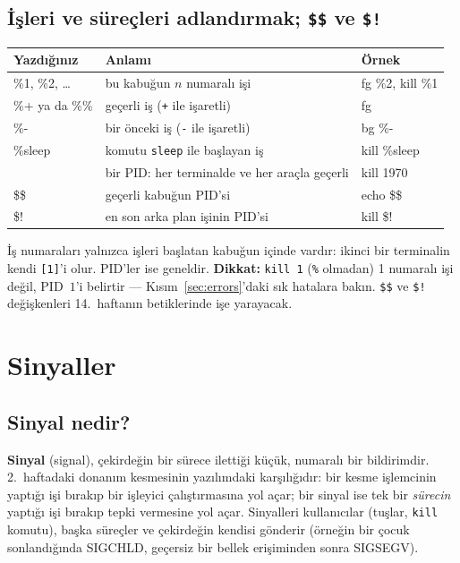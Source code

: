 \documentclass[11pt,a4paper]{article}
\newcommand{\term}[1]{\textbf{\color{mintdeep}#1}}
\newcommand{\cmd}[1]{\texttt{#1}}
\begin{document}
\subsection{İşleri ve süreçleri adlandırmak; \texttt{\$\$} ve \texttt{\$!}}

\begin{center}
\renewcommand{\arraystretch}{1.2}
\begin{tabularx}{\linewidth}{>{\ttfamily}l >{\raggedright\arraybackslash}X >{\ttfamily}l}
\toprule
\textbf{\rmfamily Yazdığınız} & \textbf{Anlamı} & \textbf{\rmfamily Örnek}\\
\midrule
\%1, \%2, \dots & bu kabuğun $n$ numaralı işi & fg \%2, kill \%1\\
\%+ \textrm{ya da} \%\% & geçerli iş (\texttt{+} ile işaretli) & fg\\
\%- & bir önceki iş (\texttt{-} ile işaretli) & bg \%-\\
\%sleep & komutu \texttt{sleep} ile başlayan iş & kill \%sleep\\
1970 & bir PID: her terminalde ve her araçla geçerli & kill 1970\\
\$\$ & geçerli kabuğun PID'si & echo \$\$\\
\$! & en son arka plan işinin PID'si & kill \$!\\
\bottomrule
\end{tabularx}
\end{center}

İş numaraları yalnızca işleri başlatan kabuğun içinde vardır: ikinci bir terminalin kendi \texttt{[1]}'i olur. PID'ler ise geneldir. \textbf{Dikkat:} \cmd{kill 1} (\texttt{\%} olmadan) 1 numaralı işi değil, PID~$1$'i belirtir --- Kısım~\ref{sec:errors}'daki sık hatalara bakın. \verb|$$| ve \verb|$!| değişkenleri 14.~haftanın betiklerinde işe yarayacak.

\section{Sinyaller}
\label{sec:signals}

\subsection{Sinyal nedir?}

\term{Sinyal} (signal), çekirdeğin bir sürece ilettiği küçük, numaralı bir bildirimdir. 2.~haftadaki donanım kesmesinin yazılımdaki karşılığıdır: bir kesme işlemcinin yaptığı işi bırakıp bir işleyici çalıştırmasına yol açar; bir sinyal ise tek bir \emph{sürecin} yaptığı işi bırakıp tepki vermesine yol açar. Sinyalleri kullanıcılar (tuşlar, \cmd{kill} komutu), başka süreçler ve çekirdeğin kendisi gönderir (örneğin bir çocuk sonlandığında SIGCHLD, geçersiz bir bellek erişiminden sonra SIGSEGV).
\end{document}

